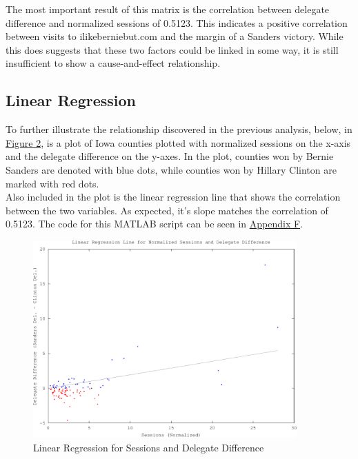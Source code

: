 \documentclass[11pt]{article}
\begin{document}
\begin{multicols}{2}

The most important result of this matrix is the correlation between delegate difference and normalized sessions of 0.5123. This indicates a positive correlation between visits to ilikeberniebut.com and the margin of a Sanders victory. While this does suggests that these two factors could be linked in some way, it is still insufficient to show a cause-and-effect relationship. \\

\subsection{Linear Regression}

To further illustrate the relationship discovered in the previous analysis, below, in \underline{Figure 2}, is a plot of Iowa counties plotted with normalized sessions on the x-axis and the delegate difference on the y-axes. In the plot, counties won by Bernie Sanders are denoted with blue dots, while counties won by Hillary Clinton are marked with red dots. \\

Also included in the plot is the linear regression line that shows the correlation between the two variables. As expected, it's slope matches the correlation of 0.5123. The code for this MATLAB script can be seen in \underline{Appendix F}.

\end{multicols}

\begin{figure}[H]
    \caption{Linear Regression for Sessions and Delegate Difference}
    \centering
    \includegraphics[width=0.9\textwidth]{iowa-corr-sessions-crop}
\end{figure}
 
\end{document}
